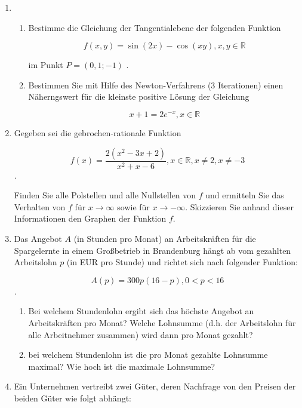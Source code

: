 \documentclass[12pt,a4paper]{scrreprt}
\newcommand{\R}{\mathds{R}}
\begin{document}

\begin{enumerate}

\item %

\begin{enumerate}

\item
Bestimme die Gleichung der Tangentialebene der folgenden Funktion

\[
f(x, y) = \sin(2x) - \cos(xy), x,y \in \R
\]

im Punkt $P=(0,1; -1)$ .

\item %
Bestimmen Sie mit Hilfe des Newton-Verfahrens (3 Iterationen) einen Näherngswert für die kleinste positive Lösung der Gleichung

\[
x+1 = 2e^{-x}, x \in \R
\]

\end{enumerate}

\item %
Gegeben sei die gebrochen-rationale Funktion

\[
f(x) = \frac{2(x^2-3x+2)}{x^2+x-6}, x \in \R, x \neq 2, x \neq -3
\].

Finden Sie alle Polstellen und alle Nullstellen von $f$ und ermitteln Sie das Verhalten von $f$ für $x \rightarrow \infty$
sowie für $x \rightarrow -\infty$. Skizzieren Sie anhand dieser Informationen den Graphen der Funktion $f$.

\item %
Das Angebot $A$ (in Stunden pro Monat) an Arbeitskräften für die Spargelernte in einem Großbetrieb in
Brandenburg hängt ab vom gezahlten Arbeitslohn $p$ (in EUR pro Stunde) und richtet sich nach folgender Funktion:

\[
A(p) = 300p(16-p), 0<p<16
\].

\begin{enumerate}
\item Bei welchem Stundenlohn ergibt sich das höchste Angebot an Arbeitskräften pro Monat?
Welche Lohnsumme (d.h. der Arbeitslohn für alle Arbeitnehmer zusammen) wird dann pro Monat gezahlt?
\item bei welchem Stundenlohn ist die pro Monat gezahlte Lohnsumme maximal? Wie hoch ist die maximale Lohnsumme?
\end{enumerate}

\item %
Ein Unternehmen vertreibt zwei Güter, deren Nachfrage von den Preisen der beiden Güter wie folgt abhängt:


\end{enumerate}
\end{document}

